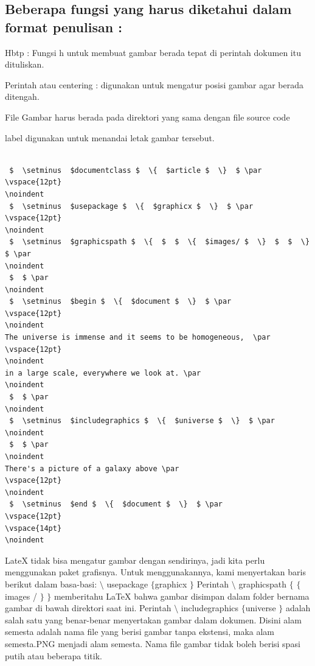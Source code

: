 \subsection {Beberapa fungsi yang harus diketahui dalam format penulisan :}
\item Hbtp : Fungsi h untuk membuat gambar berada tepat di perintah dokumen itu dituliskan. 
\item Perintah atau centering : digunakan untuk mengatur posisi gambar agar berada ditengah.
\item File Gambar harus berada pada direktori yang sama dengan file source code
\item label digunakan untuk menandai letak gambar tersebut.
\vspace{12pt}
\noindent
\begin{verbatim}

 $  \setminus  $documentclass $  \{  $article $  \}  $ \par
\vspace{12pt}
\noindent
 $  \setminus  $usepackage $  \{  $graphicx $  \}  $ \par
\vspace{12pt}
\noindent
 $  \setminus  $graphicspath $  \{  $  $  \{  $images/ $  \}  $  $  \}  $ \par
\noindent
 $  $ \par
\noindent
 $  \setminus  $begin $  \{  $document $  \}  $ \par
\vspace{12pt}
\noindent
The universe is immense and it seems to be homogeneous,  \par
\vspace{12pt}
\noindent
in a large scale, everywhere we look at. \par
\noindent
 $  $ \par
\noindent
 $  \setminus  $includegraphics $  \{  $universe $  \}  $ \par
\noindent
 $  $ \par
\noindent
There's a picture of a galaxy above \par
\vspace{12pt}
\noindent
 $  \setminus  $end $  \{  $document $  \}  $ \par
\vspace{12pt}
\vspace{14pt}
\noindent
\end{verbatim}
 \hspace*{0.5in} LateX tidak bisa mengatur gambar dengan sendirinya, jadi kita perlu menggunakan paket grafisnya. Untuk menggunakannya, kami menyertakan baris berikut dalam basa-basi:  $  \setminus  $ usepackage  $  \{  $graphicx $  \}  $ Perintah  $  \setminus  $ graphicspath  $  \{  $ $  \{  $images / $  \}  $ $  \}  $ memberitahu LaTeX bahwa gambar disimpan dalam folder bernama gambar di bawah direktori saat ini. Perintah  $  \setminus  $ includegraphics  $  \{  $universe $  \}  $ adalah salah satu yang benar-benar menyertakan gambar dalam dokumen. Disini alam semesta adalah nama file yang berisi gambar tanpa ekstensi, maka alam semesta.PNG menjadi alam semesta. Nama file gambar tidak boleh berisi spasi putih atau beberapa titik. \par
